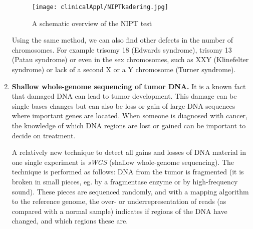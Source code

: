 \begin{enumerate}
	\begin{figure}[H]
		\centering
		\texttt{[image: clinicalAppl/NIPTkadering.jpg]}
		\caption{A schematic overview of the NIPT test}
		\label{fig:NIPT}
	\end{figure}
	
	Using the same method, we can also find other defects in the number of chromosomes. For example trisomy 18 (Edwards syndrome), trisomy 13 (Patau syndrome) or even in the sex chromosomes, such as XXY (Klinefelter syndrome) or lack of a second X or a Y chromosome (Turner syndrome).
	
	\item \textbf{Shallow whole-genome sequencing of tumor DNA.}\newline
	It is a known fact that damaged DNA can lead to tumor development. This damage can be single bases changes but can also be loss or gain of large DNA sequences where important genes are located. When someone is diagnosed with cancer, the knowledge of which DNA regions are lost or gained can be important to decide on treatment. 
	
	A relatively new technique to detect all gains and losses of DNA material in one single experiment is \emph{sWGS} (shallow whole-genome sequencing). The technique is performed as follows: DNA from the tumor is fragmented (it is broken in small pieces, eg. by a fragmentase enzyme or by high-frequency sound). These pieces are sequenced randomly, and with a mapping algorithm to the reference genome, the over- or underrepresentation of reads (as compared with a normal sample) indicates if regions of the DNA have changed, and which regions these are.
\end{enumerate}



